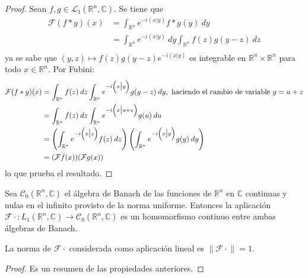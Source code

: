 \documentclass[12pt]{report}
\theoremstyle{largebreak}
\newcommand\cf[3]{\ensuremath{#1:#2\rightarrow#3}}
\newcommand\norm[1]{\ensuremath{\|#1\|}}
\newcommand\pint[2]{\ensuremath{\left(#1\big| #2\right)}}
\newcommand{\fou}[1]{\ensuremath{\mathcal{F}#1}}
\begin{document}
    \begin{proof}
        Sean $f,g\in\mathcal{L}_1(\mathbb{R}^n,\mathbb{C})$. Se tiene que
        \begin{equation*}
            \begin{split}
                \fou{(f*g)}(x)&=\int_{\mathbb{R}^n}e^{ -i\pint{x}{y}}f*g(y)\:dy\\
                &=\int_{\mathbb{R}^n}e^{ -i\pint{x}{y}}\:dy\int_{\mathbb{R}^n}f(z)g(y-z)\:dz\\
            \end{split}
        \end{equation*}
        ya se sabe que $(y,z)\mapsto f(z)g(y-z)e^{ -i\pint{x}{y}}$ es integrable en $\mathbb{R}^n\times\mathbb{R}^n$ para todo $x\in\mathbb{R}^n$. Por Fubini:
        \begin{equation*}
            \begin{split}
                \fou{(f*g)}(x)&=\int_{\mathbb{R}^n}f(z)\:dz\int_{\mathbb{R}^n}e^{ -i\pint{x}{y}}g(y-z)\:dy,\textup{ haciendo el cambio de variable }y=u+z\\
                &=\int_{\mathbb{R}^n}f(z)\:dz\int_{\mathbb{R}^n}e^{-i\pint{x}{u+z}}g(u)\:du\\
                &=\left(\int_{\mathbb{R}^n}e^{ -i\pint{x}{z}}f(z)\:dz \right)\left(\int_{\mathbb{R}^n}e^{ -i\pint{x}{y}}g(y)\:dy \right)\\
                &=(\fou{f}(x))(\fou{g}(x))\\
            \end{split}
        \end{equation*}
        lo que prueba el resultado.
    \end{proof}

    \begin{theor}
        Sea $\mathcal{C}_0(\mathbb{R}^n,\mathbb{C})$ el álgebra de Banach de las funciones de $\mathbb{R}^n$ en $\mathbb{C}$ continuas y nulas en el infinito provisto de la norma uniforme. Entonces la aplicación $\cf{\fou{\cdot}}{L_1(\mathbb{R}^n,\mathbb{C})}{\mathcal{C}_0(\mathbb{R}^n,\mathbb{C})}$ es un homomorfismo continuo entre ambas álgebras de Banach.

        La norma de $\fou{\cdot}$ considerada como aplicación lineal es $\norm{\fou{\cdot}}=1$.
    \end{theor}

    \begin{proof}
        Es un resumen de las propiedades anteriores.
    \end{proof}
\end{document}
